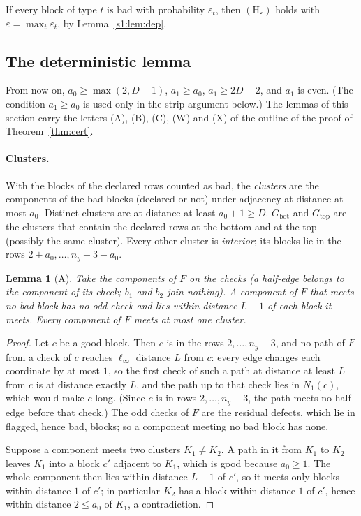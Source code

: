 \documentclass[11pt]{amsart}
\newtheorem{lemma}[theorem]{Lemma}
\theoremstyle{definition}
\theoremstyle{remark}
\numberwithin{equation}{section}
\newcommand{\eps}{\varepsilon}
\newcommand{\Gbot}{G_{\mathrm{bot}}}
\newcommand{\Gtop}{G_{\mathrm{top}}}
\begin{document}
If every block of type $t$ is bad with probability $\eps_t$, then $(\mathrm H_\eps)$ holds with $\eps=\max_t\eps_t$, by Lemma~\ref{s1:lem:dep}.

\subsection{The deterministic lemma}\label{s1:sec:det}
From now on, $a_0\ge\max(2,D-1)$, $a_1\ge a_0$, $a_1\ge2D-2$, and $a_1$ is even. (The condition $a_1\ge a_0$ is used only in the strip argument below.) The lemmas of this section carry the letters (A), (B), (C), (W) and (X) of the outline of the proof of Theorem~\ref{thm:cert}.

\paragraph{Clusters.} With the blocks of the declared rows counted as bad, the \emph{clusters} are the components of the bad blocks (declared or not) under adjacency at distance at most $a_0$. Distinct clusters are at distance at least $a_0+1\ge D$. $\Gbot$ and $\Gtop$ are the clusters that contain the declared rows at the bottom and at the top (possibly the same cluster). Every other cluster is \emph{interior}; its blocks lie in the rows $2+a_0,\dots,n_y-3-a_0$.

\begin{lemma}[A]\label{s1:lem:A}
Take the components of $F$ on the checks (a half-edge belongs to the component of its check; $b_1$ and $b_2$ join nothing). A component of $F$ that meets no bad block has no odd check and lies within distance $L-1$ of each block it meets. Every component of $F$ meets at most one cluster.
\end{lemma}

\begin{proof}
Let $c$ be a good block. Then $c$ is in the rows $2,\dots,n_y-3$, and no path of $F$ from a check of $c$ reaches $\ell_\infty$ distance $L$ from $c$: every edge changes each coordinate by at most $1$, so the first check of such a path at distance at least $L$ from $c$ is at distance exactly $L$, and the path up to that check lies in $N_1(c)$, which would make $c$ long. (Since $c$ is in rows $2,\dots,n_y-3$, the path meets no half-edge before that check.) The odd checks of $F$ are the residual defects, which lie in flagged, hence bad, blocks; so a component meeting no bad block has none.

Suppose a component meets two clusters $K_1\ne K_2$. A path in it from $K_1$ to $K_2$ leaves $K_1$ into a block $c'$ adjacent to $K_1$, which is good because $a_0\ge1$. The whole component then lies within distance $L-1$ of $c'$, so it meets only blocks within distance $1$ of $c'$; in particular $K_2$ has a block within distance $1$ of $c'$, hence within distance $2\le a_0$ of $K_1$, a contradiction.
\end{proof}
\end{document}
